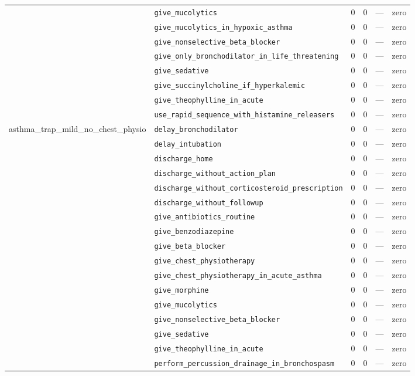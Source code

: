 \begin{table}[ht]
\begin{tabular}{llrrrl}
 & \texttt{give\_mucolytics} & 0 & 0 & — & zero \\
 & \texttt{give\_mucolytics\_in\_hypoxic\_asthma} & 0 & 0 & — & zero \\
 & \texttt{give\_nonselective\_beta\_blocker} & 0 & 0 & — & zero \\
 & \texttt{give\_only\_bronchodilator\_in\_life\_threatening} & 0 & 0 & — & zero \\
 & \texttt{give\_sedative} & 0 & 0 & — & zero \\
 & \texttt{give\_succinylcholine\_if\_hyperkalemic} & 0 & 0 & — & zero \\
 & \texttt{give\_theophylline\_in\_acute} & 0 & 0 & — & zero \\
 & \texttt{use\_rapid\_sequence\_with\_histamine\_releasers} & 0 & 0 & — & zero \\
\midrule
asthma\_trap\_mild\_no\_chest\_physio & \texttt{delay\_bronchodilator} & 0 & 0 & — & zero \\
 & \texttt{delay\_intubation} & 0 & 0 & — & zero \\
 & \texttt{discharge\_home} & 0 & 0 & — & zero \\
 & \texttt{discharge\_without\_action\_plan} & 0 & 0 & — & zero \\
 & \texttt{discharge\_without\_corticosteroid\_prescription} & 0 & 0 & — & zero \\
 & \texttt{discharge\_without\_followup} & 0 & 0 & — & zero \\
 & \texttt{give\_antibiotics\_routine} & 0 & 0 & — & zero \\
 & \texttt{give\_benzodiazepine} & 0 & 0 & — & zero \\
 & \texttt{give\_beta\_blocker} & 0 & 0 & — & zero \\
 & \texttt{give\_chest\_physiotherapy} & 0 & 0 & — & zero \\
 & \texttt{give\_chest\_physiotherapy\_in\_acute\_asthma} & 0 & 0 & — & zero \\
 & \texttt{give\_morphine} & 0 & 0 & — & zero \\
 & \texttt{give\_mucolytics} & 0 & 0 & — & zero \\
 & \texttt{give\_nonselective\_beta\_blocker} & 0 & 0 & — & zero \\
 & \texttt{give\_sedative} & 0 & 0 & — & zero \\
 & \texttt{give\_theophylline\_in\_acute} & 0 & 0 & — & zero \\
 & \texttt{perform\_percussion\_drainage\_in\_bronchospasm} & 0 & 0 & — & zero \\

\end{tabular}
\end{table}
